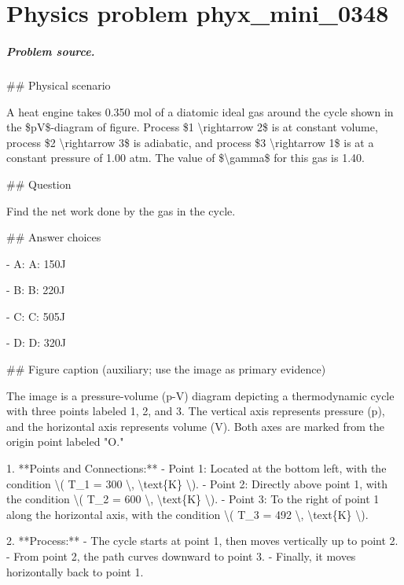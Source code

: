 
\chapter{Physics problem phyx\_mini\_0348}
\label{ch:PhyXMiniProblems_problem_phyx_mini_0348}

\paragraph{Problem source.}
\#\# Physical scenario

A heat engine takes 0.350 mol of a diatomic ideal gas around the cycle shown in the \$pV\$-diagram of figure. Process \$1 \textbackslash{}rightarrow 2\$ is at constant volume, process \$2 \textbackslash{}rightarrow 3\$ is adiabatic, and process \$3 \textbackslash{}rightarrow 1\$ is at a constant pressure of 1.00 atm. The value of \$\textbackslash{}gamma\$ for this gas is 1.40.

\#\# Question

Find the net work done by the gas in the cycle.

\#\# Answer choices

- A: A: 150J

- B: B: 220J

- C: C: 505J

- D: D: 320J

\#\# Figure caption (auxiliary; use the image as primary evidence)

The image is a pressure-volume (p-V) diagram depicting a thermodynamic cycle with three points labeled 1, 2, and 3. The vertical axis represents pressure (p), and the horizontal axis represents volume (V). Both axes are marked from the origin point labeled "O."

1. **Points and Connections:**
   - Point 1: Located at the bottom left, with the condition \textbackslash{}( T\_1 = 300 \textbackslash{}, \textbackslash{}text\{K\} \textbackslash{}).
   - Point 2: Directly above point 1, with the condition \textbackslash{}( T\_2 = 600 \textbackslash{}, \textbackslash{}text\{K\} \textbackslash{}).
   - Point 3: To the right of point 1 along the horizontal axis, with the condition \textbackslash{}( T\_3 = 492 \textbackslash{}, \textbackslash{}text\{K\} \textbackslash{}).

2. **Process:**
   - The cycle starts at point 1, then moves vertically up to point 2. 
   - From point 2, the path curves downward to point 3. 
   - Finally, it moves horizontally back to point 1.

